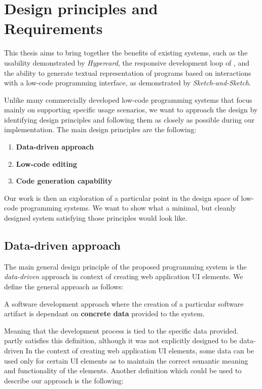 \chapter{Design principles and Requirements}
\label{chap:design}

This thesis aims to bring together the benefits of existing systems, such as the usability demonstrated by \emph{Hypercard},
the responsive development loop of \citet{darklang}, and the ability to generate textual representation of programs based on
interactions with a low-code programming interface, as demonstrated by \emph{Sketch-and-Sketch}\cite{sketch-and-sketch}.

Unlike many commercially developed low-code programming systems that focus mainly on supporting specific usage scenarios,
we want to approach the design by identifying design principles and following them as closely as possible during our implementation.
The main design principles are the following:
\begin{enumerate}
	\item \textbf{Data-driven approach}
	\item \textbf{Low-code editing}
	\item \textbf{Code generation capability}
\end{enumerate}

Our work is then an exploration of a particular point in the design space of low-code programming systems.
We want to show what a minimal, but cleanly designed system satisfying those principles would look like.

\section{Data-driven approach}

The main general design principle of the proposed programming system is the \emph{data-driven} approach in context of creating web application UI elements.
We define the general approach as follows:
\begin{defn}
	A software development approach where the creation of a particular software artifact is dependant on \textbf{concrete data} provided to the system.
\end{defn}

Meaning that the development process is tied to the specific data provided.
\citet{darklang} partly satisfies this definition, although it was not explicitly designed to be data-driven
In the context of creating web application UI elements, some data can be used only for certain UI elements as to maintain the correct semantic meaning and functionality of the elements.
Another definition which could be used to describe our approach is the following:

